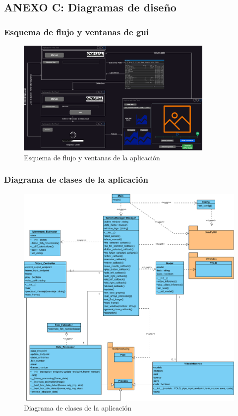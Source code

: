 \subsection*{ANEXO C: Diagramas de diseño}
\subsubsection*{Esquema de flujo y ventanas de \acrshort{gui}}
\label{esquema:FlujoVentanas}
\begin{figure}[H]
    \centering
    \includegraphics[angle=90,origin=c,width=0.85\textwidth]{images/13/c/Interfaz.png}
    \caption{Esquema de flujo y ventanas de la aplicación}
    \label{fig:FlujoVentanas}
\end{figure}
\clearpage
\subsubsection*{Diagrama de clases de la aplicación}
\label{esquema:DiagramaClases}
\begin{figure}[H]
    \centering
    \includegraphics[width=\textwidth]{images/13/c/ClasesTFG.png}
    \caption{Diagrama de clases de la aplicación}
    \label{fig:DiagramaClases}
\end{figure}
